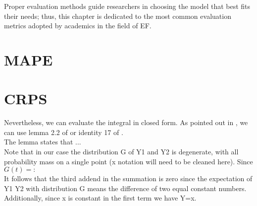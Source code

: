 Proper evaluation methods guide researchers in choosing the model that best fits their needs; thus, this chapter is dedicated to the most common evaluation metrics adopted by academics in the field of EF.
\section{MAPE}\label{mape}



\section{CRPS}
Nevertheless, we can evaluate the integral in closed form. 
As pointed out in \cite{proper_scores}, we can use lemma 2.2 of \cite{new_multi_tes1} or identity 17 of \cite{new_multi_test2}.
\\
The lemma states that ...
\\
Note that in our case the distribution G of Y1 and Y2 is degenerate, with all probability mass on a single point (x notation will need to be cleaned here). Since $G(t)=:$
\\
It follows that the third addend in the summation is zero since the expectation of Y1 Y2 with distribution G means the difference of two equal constant numbers.
\\
Additionally, since x is constant in the first term we have Y=x.